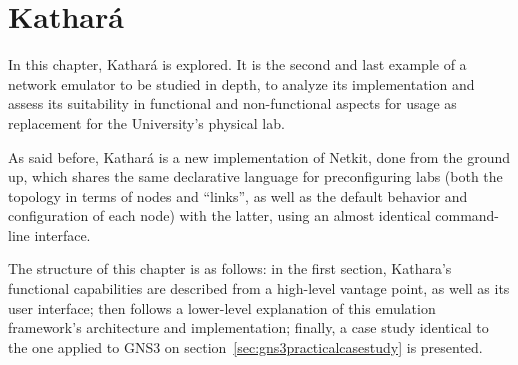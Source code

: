 
\chapter{Kathará}
\label{ch:kathara}

In this chapter, Kathará is explored. It is the second and last example of a network emulator to be studied in depth, to analyze its implementation and assess its suitability in functional and non-functional aspects for usage as replacement for the University's physical lab.

As said before, Kathará is a new implementation of Netkit, done from the ground up, which shares the same declarative language for preconfiguring labs (both the topology in terms of nodes and ``links'', as well as the default behavior and configuration of each node) with the latter, using an almost identical command-line interface.


The structure of this chapter is as follows: in the first section, Kathara's functional capabilities are described from a high-level vantage point, as well as its user interface; then follows a lower-level explanation of this emulation framework's architecture and implementation; finally, a case study identical to the one applied to GNS3 on section~\ref{sec:gns3practicalcasestudy} is presented.







